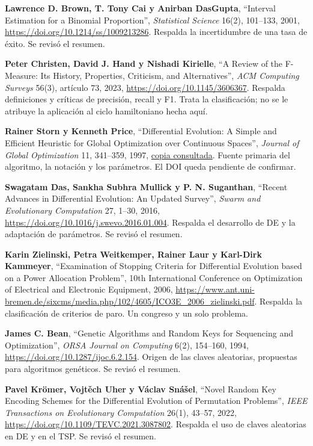 \documentclass[letterpaper,12pt]{report}
\begin{document}
\begin{enumerate}[leftmargin=*,label={[\arabic*]},itemsep=3pt]
\item \textbf{Lawrence D. Brown, T. Tony Cai y Anirban DasGupta}, ``Interval Estimation for a Binomial Proportion'', \emph{Statistical Science} 16(2), 101--133, 2001, \url{https://doi.org/10.1214/ss/1009213286}. Respalda la incertidumbre de una tasa de éxito. Se revisó el resumen.
\item \textbf{Peter Christen, David J. Hand y Nishadi Kirielle}, ``A Review of the F-Measure: Its History, Properties, Criticism, and Alternatives'', \emph{ACM Computing Surveys} 56(3), artículo 73, 2023, \url{https://doi.org/10.1145/3606367}. Respalda definiciones y críticas de precisión, recall y F1. Trata la clasificación; no se le atribuye la aplicación al ciclo hamiltoniano hecha aquí.
\item \textbf{Rainer Storn y Kenneth Price}, ``Differential Evolution: A Simple and Efficient Heuristic for Global Optimization over Continuous Spaces'', \emph{Journal of Global Optimization} 11, 341--359, 1997, \href{https://www.cp.eng.chula.ac.th/~piak/teaching/ec/ec2012/storn_price_de.pdf}{copia consultada}. Fuente primaria del algoritmo, la notación y los parámetros. El DOI queda pendiente de confirmar.
\item \textbf{Swagatam Das, Sankha Subhra Mullick y P. N. Suganthan}, ``Recent Advances in Differential Evolution: An Updated Survey'', \emph{Swarm and Evolutionary Computation} 27, 1--30, 2016, \url{https://doi.org/10.1016/j.swevo.2016.01.004}. Respalda el desarrollo de DE y la adaptación de parámetros. Se revisó el resumen.
\item \textbf{Karin Zielinski, Petra Weitkemper, Rainer Laur y Karl-Dirk Kammeyer}, ``Examination of Stopping Criteria for Differential Evolution based on a Power Allocation Problem'', 10th International Conference on Optimization of Electrical and Electronic Equipment, 2006, \url{https://www.ant.uni-bremen.de/sixcms/media.php/102/4605/ICO3E_2006_zielinski.pdf}. Respalda la clasificación de criterios de paro. Un congreso y un solo problema.
\item \textbf{James C. Bean}, ``Genetic Algorithms and Random Keys for Sequencing and Optimization'', \emph{ORSA Journal on Computing} 6(2), 154--160, 1994, \url{https://doi.org/10.1287/ijoc.6.2.154}. Origen de las claves aleatorias, propuestas para algoritmos genéticos. Se revisó el resumen.
\item \textbf{Pavel Krömer, Vojtěch Uher y Václav Snášel}, ``Novel Random Key Encoding Schemes for the Differential Evolution of Permutation Problems'', \emph{IEEE Transactions on Evolutionary Computation} 26(1), 43--57, 2022, \url{https://doi.org/10.1109/TEVC.2021.3087802}. Respalda el uso de claves aleatorias en DE y en el TSP. Se revisó el resumen.

\end{enumerate}
\end{document}
